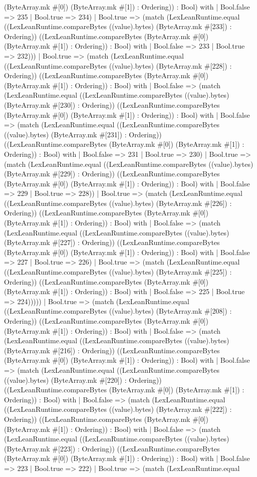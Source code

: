 \documentclass[11pt]{article}
\begin{document}
(ByteArray.mk \#[0]) (ByteArray.mk \#[1]) : Ordering)) : Bool) with | Bool.false => 235 | Bool.true => 234) | Bool.true => (match (LexLeanRuntime.equal ((LexLeanRuntime.compareBytes ((value).bytes) (ByteArray.mk \#[233]) : Ordering)) ((LexLeanRuntime.compareBytes (ByteArray.mk \#[0]) (ByteArray.mk \#[1]) : Ordering)) : Bool) with | Bool.false => 233 | Bool.true => 232))) | Bool.true => (match (LexLeanRuntime.equal ((LexLeanRuntime.compareBytes ((value).bytes) (ByteArray.mk \#[228]) : Ordering)) ((LexLeanRuntime.compareBytes (ByteArray.mk \#[0]) (ByteArray.mk \#[1]) : Ordering)) : Bool) with | Bool.false => (match (LexLeanRuntime.equal ((LexLeanRuntime.compareBytes ((value).bytes) (ByteArray.mk \#[230]) : Ordering)) ((LexLeanRuntime.compareBytes (ByteArray.mk \#[0]) (ByteArray.mk \#[1]) : Ordering)) : Bool) with | Bool.false => (match (LexLeanRuntime.equal ((LexLeanRuntime.compareBytes ((value).bytes) (ByteArray.mk \#[231]) : Ordering)) ((LexLeanRuntime.compareBytes (ByteArray.mk \#[0]) (ByteArray.mk \#[1]) : Ordering)) : Bool) with | Bool.false => 231 | Bool.true => 230) | Bool.true => (match (LexLeanRuntime.equal ((LexLeanRuntime.compareBytes ((value).bytes) (ByteArray.mk \#[229]) : Ordering)) ((LexLeanRuntime.compareBytes (ByteArray.mk \#[0]) (ByteArray.mk \#[1]) : Ordering)) : Bool) with | Bool.false => 229 | Bool.true => 228)) | Bool.true => (match (LexLeanRuntime.equal ((LexLeanRuntime.compareBytes ((value).bytes) (ByteArray.mk \#[226]) : Ordering)) ((LexLeanRuntime.compareBytes (ByteArray.mk \#[0]) (ByteArray.mk \#[1]) : Ordering)) : Bool) with | Bool.false => (match (LexLeanRuntime.equal ((LexLeanRuntime.compareBytes ((value).bytes) (ByteArray.mk \#[227]) : Ordering)) ((LexLeanRuntime.compareBytes (ByteArray.mk \#[0]) (ByteArray.mk \#[1]) : Ordering)) : Bool) with | Bool.false => 227 | Bool.true => 226) | Bool.true => (match (LexLeanRuntime.equal ((LexLeanRuntime.compareBytes ((value).bytes) (ByteArray.mk \#[225]) : Ordering)) ((LexLeanRuntime.compareBytes (ByteArray.mk \#[0]) (ByteArray.mk \#[1]) : Ordering)) : Bool) with | Bool.false => 225 | Bool.true => 224))))) | Bool.true => (match (LexLeanRuntime.equal ((LexLeanRuntime.compareBytes ((value).bytes) (ByteArray.mk \#[208]) : Ordering)) ((LexLeanRuntime.compareBytes (ByteArray.mk \#[0]) (ByteArray.mk \#[1]) : Ordering)) : Bool) with | Bool.false => (match (LexLeanRuntime.equal ((LexLeanRuntime.compareBytes ((value).bytes) (ByteArray.mk \#[216]) : Ordering)) ((LexLeanRuntime.compareBytes (ByteArray.mk \#[0]) (ByteArray.mk \#[1]) : Ordering)) : Bool) with | Bool.false => (match (LexLeanRuntime.equal ((LexLeanRuntime.compareBytes ((value).bytes) (ByteArray.mk \#[220]) : Ordering)) ((LexLeanRuntime.compareBytes (ByteArray.mk \#[0]) (ByteArray.mk \#[1]) : Ordering)) : Bool) with | Bool.false => (match (LexLeanRuntime.equal ((LexLeanRuntime.compareBytes ((value).bytes) (ByteArray.mk \#[222]) : Ordering)) ((LexLeanRuntime.compareBytes (ByteArray.mk \#[0]) (ByteArray.mk \#[1]) : Ordering)) : Bool) with | Bool.false => (match (LexLeanRuntime.equal ((LexLeanRuntime.compareBytes ((value).bytes) (ByteArray.mk \#[223]) : Ordering)) ((LexLeanRuntime.compareBytes (ByteArray.mk \#[0]) (ByteArray.mk \#[1]) : Ordering)) : Bool) with | Bool.false => 223 | Bool.true => 222) | Bool.true => (match (LexLeanRuntime.equal 
\end{document}
